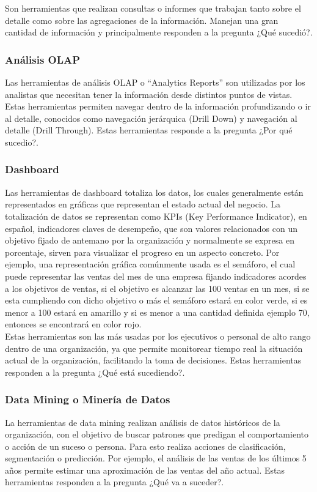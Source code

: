 Son herramientas que realizan consultas o informes que trabajan tanto sobre el detalle como sobre las agregaciones de la información. Manejan una gran cantidad de información y principalmente responden a la pregunta ¿Qué sucedió?.

\subsubsection{Análisis OLAP}

Las herramientas de análisis OLAP o ``Analytics Reports'' son utilizadas por los analistas que necesitan tener la información desde distintos puntos de vistas. Estas herramientas permiten navegar dentro de la información profundizando o ir al detalle, conocidos como navegación jerárquica (Drill Down) y navegación al detalle (Drill Through). Estas herramientas responde a la pregunta ¿Por qué sucedio?.

\subsubsection{Dashboard}

Las herramientas de dashboard totaliza los datos, los cuales generalmente están representados en gráficas que representan el estado actual del negocio. La totalización de datos se representan como KPIs (Key Performance Indicator), en español, indicadores claves de desempeño, que son valores relacionados con un objetivo fijado de antemano por la organización y normalmente se expresa en porcentaje, sirven para visualizar el progreso en un aspecto concreto. Por ejemplo, una representación gráfica comúnmente usada es el semáforo, el cual puede representar las ventas del mes de una empresa fijando indicadores acordes a los objetivos de ventas, si el objetivo es alcanzar las 100 ventas en un mes, si se esta cumpliendo con dicho objetivo o más el semáforo estará en color verde, si es menor a 100 estará en amarillo y si es menor a una cantidad definida ejemplo 70, entonces se encontrará en color rojo.\\

Estas herramientas son las más usadas por los ejecutivos o personal de alto rango dentro de una organización, ya que permite monitorear tiempo real la situación actual de la organización, facilitando la toma de decisiones. Estas herramientas responden a la pregunta ¿Qué está sucediendo?.

\subsubsection{Data Mining o Minería de Datos}

La herramientas de data mining realizan análisis de datos históricos de la organización, con el objetivo de buscar patrones que predigan el comportamiento o acción de un suceso o persona. Para esto realiza acciones de clasificación, segmentación o predicción. Por ejemplo, el análisis de las ventas de los últimos 5 años permite estimar una aproximación de las ventas del año actual. Estas herramientas responden a la pregunta ¿Qué va a suceder?.





